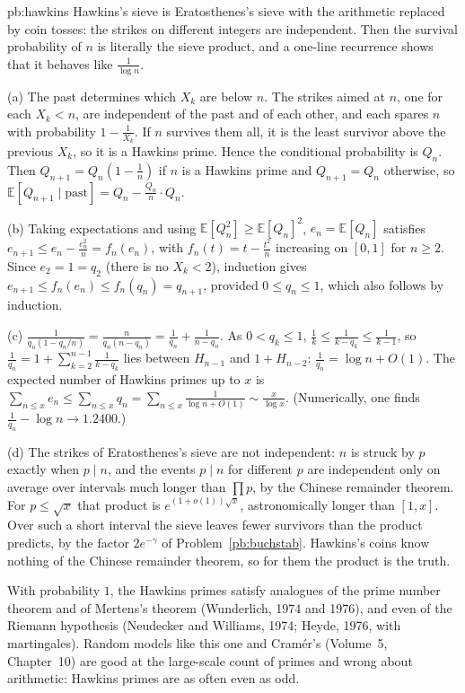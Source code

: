\begin{solution}{pb:hawkins}
\idea Hawkins's sieve is Eratosthenes's sieve with the arithmetic replaced by coin tosses: the strikes on different integers are independent. Then the survival probability of $n$ is
literally the sieve product, and a one-line recurrence shows that it behaves like $\frac1{\log n}$.

\writeup (a) The past determines which $X_k$ are below $n$. The strikes aimed at $n$, one for each $X_k<n$, are independent of the past and of each other, and each spares $n$ with probability
$1-\frac1{X_k}$. If $n$ survives them all, it is the least survivor above the previous $X_k$, so it is a Hawkins prime. Hence the conditional probability is $Q_n$. Then $Q_{n+1}=Q_n(1-\frac1n)$
if $n$ is a Hawkins prime and $Q_{n+1}=Q_n$ otherwise, so $\mathbb E[Q_{n+1}\mid\text{past}]=Q_n-\frac{Q_n}n\cdot Q_n$.

(b) Taking expectations and using $\mathbb E[Q_n^2]\ge\mathbb E[Q_n]^2$, $e_n=\mathbb E[Q_n]$ satisfies $e_{n+1}\le e_n-\frac{e_n^2}n=f_n(e_n)$, with $f_n(t)=t-\frac{t^2}n$ increasing on
$[0,1]$ for $n\ge2$. Since $e_2=1=q_2$ (there is no $X_k<2$), induction gives $e_{n+1}\le f_n(e_n)\le f_n(q_n)=q_{n+1}$, provided $0\le q_n\le1$, which also follows by induction.

(c) $\frac1{q_n(1-q_n/n)}=\frac n{q_n(n-q_n)}=\frac1{q_n}+\frac1{n-q_n}$. As $0<q_k\le1$, $\frac1k\le\frac1{k-q_k}\le\frac1{k-1}$, so $\frac1{q_n}=1+\sum_{k=2}^{n-1}\frac1{k-q_k}$ lies
between $H_{n-1}$ and $1+H_{n-2}$: $\frac1{q_n}=\log n+O(1)$. The expected number of Hawkins primes up to $x$ is $\sum_{n\le x}e_n\le\sum_{n\le x}q_n=\sum_{n\le x}\frac1{\log n+O(1)}\sim\frac x{\log x}$.
(Numerically, one finds $\frac1{q_n}-\log n\to1.2400$.)

(d) The strikes of Eratosthenes's sieve are not independent: $n$ is struck by $p$ exactly when $p\mid n$, and the events $p\mid n$ for different $p$ are independent only on average over
intervals much longer than $\prod p$, by the Chinese remainder theorem. For $p\le\sqrt x$ that product is $e^{(1+o(1))\sqrt x}$, astronomically longer than $[1,x]$. Over such a short
interval the sieve leaves fewer survivors than the product predicts, by the factor $2e^{-\gamma}$ of Problem~\ref{pb:buchstab}. Hawkins's coins know nothing of the Chinese remainder
theorem, so for them the product is the truth.

\leads With probability $1$, the Hawkins primes satisfy analogues of the prime number theorem and of Mertens's theorem (Wunderlich, 1974 and 1976), and even of the Riemann
hypothesis (Neudecker and Williams, 1974; Heyde, 1976, with martingales). Random models
like this one and Cram\'er's (Volume~5, Chapter~10) are good at the large-scale count of primes and wrong about arithmetic: Hawkins primes are as often even as odd.
\end{solution}

